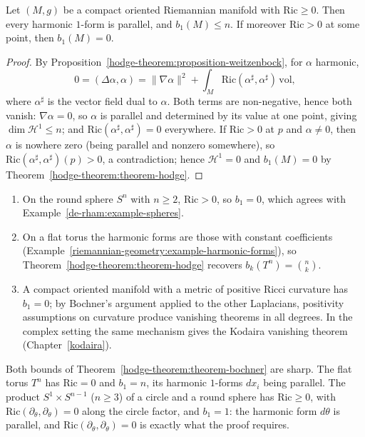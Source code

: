 \begin{theorem}[Bochner]\label{hodge-theorem:theorem-bochner}
Let $(M, g)$ be a compact oriented Riemannian manifold with $\mathrm{Ric} \geq 0$. Then every harmonic $1$-form is parallel, and $b_1(M) \leq n$. If moreover $\mathrm{Ric} > 0$ at some point, then
$b_1(M) = 0$.
\end{theorem}

\begin{proof}
By Proposition~\ref{hodge-theorem:proposition-weitzenbock}, for $\alpha$ harmonic,
\[
0 = (\Delta\alpha, \alpha) = \|\nabla\alpha\|^2 + \int_M\mathrm{Ric}(\alpha^\sharp, \alpha^\sharp)\,\mathrm{vol},
\]
where $\alpha^\sharp$ is the vector field dual to $\alpha$. Both terms are non-negative, hence both vanish: $\nabla\alpha = 0$, so $\alpha$ is parallel and determined by its value at one point, giving
$\dim\mathcal{H}^1 \leq n$; and $\mathrm{Ric}(\alpha^\sharp, \alpha^\sharp) = 0$ everywhere. If $\mathrm{Ric} > 0$ at $p$ and $\alpha \neq 0$, then $\alpha$ is nowhere zero (being parallel and nonzero somewhere), so
$\mathrm{Ric}(\alpha^\sharp, \alpha^\sharp)(p) > 0$, a contradiction; hence $\mathcal{H}^1 = 0$ and $b_1(M) = 0$ by Theorem~\ref{hodge-theorem:theorem-hodge}.
\end{proof}

\begin{example}\label{hodge-theorem:example-applications}
\begin{enumerate}
\item On the round sphere $S^n$ with $n \geq 2$, $\mathrm{Ric} > 0$, so $b_1 = 0$, which agrees with Example~\ref{de-rham:example-spheres}.
\item On a flat torus the harmonic forms are those with constant coefficients (Example~\ref{riemannian-geometry:example-harmonic-forms}), so Theorem~\ref{hodge-theorem:theorem-hodge} recovers
$b_k(T^n) = \binom{n}{k}$.
\item A compact oriented manifold with a metric of positive Ricci curvature has $b_1 = 0$; by Bochner's argument applied to the other Laplacians, positivity assumptions on curvature produce vanishing
theorems in all degrees. In the complex setting the same mechanism gives the Kodaira vanishing theorem (Chapter~\ref{kodaira}).
\end{enumerate}
\end{example}

Both bounds of Theorem~\ref{hodge-theorem:theorem-bochner} are sharp. The flat torus $T^n$ has $\mathrm{Ric} = 0$ and $b_1 = n$, its harmonic $1$-forms $dx_i$ being parallel. The product $S^1 \times S^{n-1}$
($n \geq 3$) of a circle and a round sphere has $\mathrm{Ric} \geq 0$, with $\mathrm{Ric}(\partial_\theta, \partial_\theta) = 0$ along the circle factor, and $b_1 = 1$: the harmonic form $d\theta$ is parallel, and
$\mathrm{Ric}(\partial_\theta, \partial_\theta) = 0$ is exactly what the proof requires.

